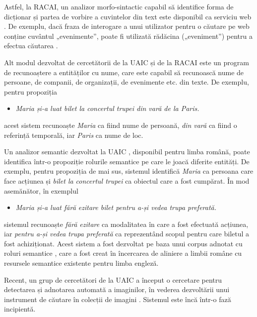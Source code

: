 \begin{multicols}{2}
Astfel, la RACAI, un analizor morfo-sintactic capabil să identifice forma de dicționar și partea de vorbire a cuvintelor din text este disponibil ca serviciu web \cite{webservicesUrl}. De exemplu, dacă fraza de interogare a unui utilizator pentru o căutare pe web conține cuvântul „evenimente”, poate fi utilizată rădăcina („eveniment”) pentru a efectua căutarea \cite{webservicesArt}.

Alt modul dezvoltat de cercetătorii de la UAIC și de la RACAI este un program de recunoaștere a entităților cu nume, care este capabil să recunoască nume de persoane, de companii, de organizații, de evenimente etc. din texte. De exemplu, pentru propoziția 

\begin{itemize}
\item\textit{Maria și-a luat bilet la concertul trupei din vară de la Paris.}
\end{itemize}

\noindent acest sistem recunoaște \textit{Maria} ca fiind nume de persoană, \textit{din vară} ca fiind o referință temporală, iar \textit{Paris} ca nume de loc.

Un analizor semantic dezvoltat la UAIC \cite{isda}, disponibil pentru limba română, poate identifica într-o propoziție rolurile semantice pe care le joacă diferite entități. De exemplu, pentru propoziția de mai sus, sistemul identifică \textit{Maria} ca persoana care face acțiunea și \textit{bilet la concertul trupei} ca obiectul care a fost cumpărat. În mod asemănător, în exemplul

\begin{itemize}
\item\textit{Maria și-a luat fără ezitare bilet pentru a-și vedea trupa preferată.}
\end{itemize}

\noindent
sistemul recunoaște \textit{fără ezitare} ca modalitatea în care a fost efectuată acțiunea, iar \textit{pentru a-și vedea trupa preferată} ca reprezentând scopul pentru care biletul a fost achiziționat. Acest sistem a fost dezvoltat pe baza unui corpus adnotat cu roluri semantice \cite{trandabat}, care a fost creat în încercarea de aliniere a limbii române cu resursele semantice existente pentru limba engleză.

Recent, un grup de cercetători de la UAIC a început o cercetare pentru detectarea și adnotarea automată a imaginilor, în vederea dezvoltării unui instrument de căutare în colecții de imagini \cite{iftene}. Sistemul este încă într-o fază incipientă.


\end{multicols}
